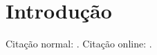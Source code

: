 
\chapter[Introdução]{Introdução}

    Citação normal: \cite{chawdhary_simple_2014}. Citação online: .